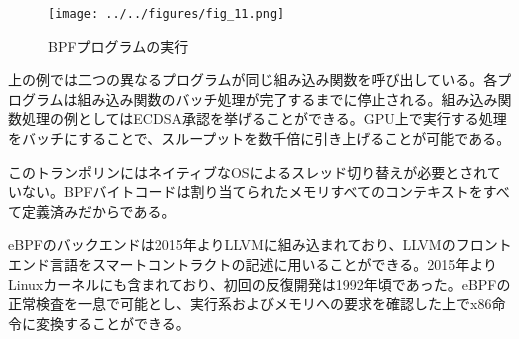 \documentclass[12pt]{ltjsarticle}
\begin{document}
\begin{figure}
  \begin{center}
    \centering
    \texttt{[image: ../../figures/fig\_11.png]}
    \caption[図11]{BPFプログラムの実行\label{fig_11}}
  \end{center}
  \end{figure}

上の例では二つの異なるプログラムが同じ組み込み関数を呼び出している。各プログラムは組み込み関数のバッチ処理が完了するまでに停止される。組み込み関数処理の例としてはECDSA承認を挙げることができる。GPU上で実行する処理をバッチにすることで、スループットを数千倍に引き上げることが可能である。

このトランポリンにはネイティブなOSによるスレッド切り替えが必要とされていない。BPFバイトコードは割り当てられたメモリすべてのコンテキストをすべて定義済みだからである。

eBPFのバックエンドは2015年よりLLVMに組み込まれており、LLVMのフロントエンド言語をスマートコントラクトの記述に用いることができる。2015年よりLinuxカーネルにも含まれており、初回の反復開発は1992年頃であった。eBPFの正常検査を一息で可能とし、実行系およびメモリへの要求を確認した上でx86命令に変換することができる。



\end{document}
